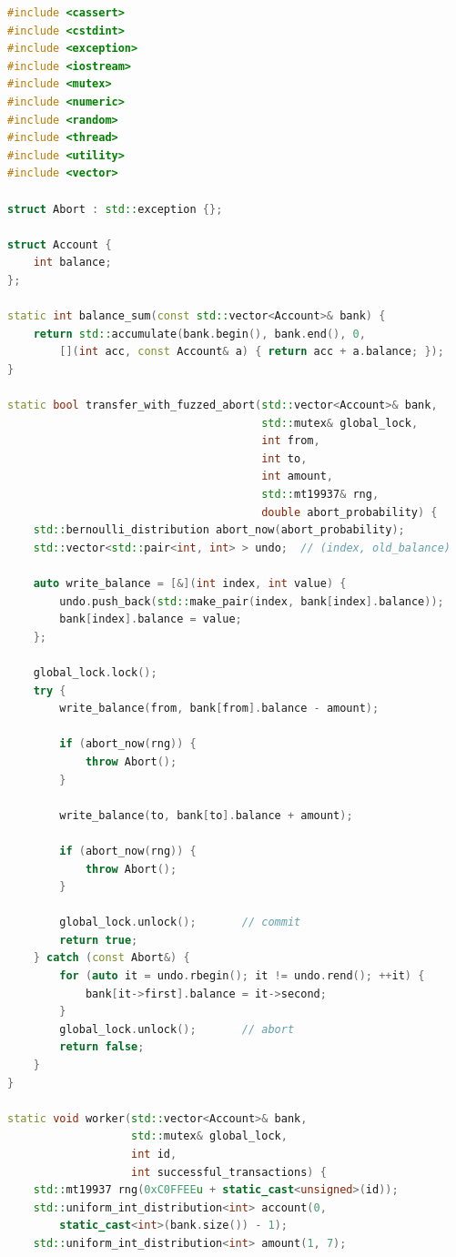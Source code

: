 \begin{lstlisting}[language=C++, caption={A compilable abort-fuzzing harness for the bank benchmark.}, label={lst:abort-fuzz}]
#include <cassert>
#include <cstdint>
#include <exception>
#include <iostream>
#include <mutex>
#include <numeric>
#include <random>
#include <thread>
#include <utility>
#include <vector>

struct Abort : std::exception {};

struct Account {
    int balance;
};

static int balance_sum(const std::vector<Account>& bank) {
    return std::accumulate(bank.begin(), bank.end(), 0,
        [](int acc, const Account& a) { return acc + a.balance; });
}

static bool transfer_with_fuzzed_abort(std::vector<Account>& bank,
                                       std::mutex& global_lock,
                                       int from,
                                       int to,
                                       int amount,
                                       std::mt19937& rng,
                                       double abort_probability) {
    std::bernoulli_distribution abort_now(abort_probability);
    std::vector<std::pair<int, int> > undo;  // (index, old_balance)

    auto write_balance = [&](int index, int value) {
        undo.push_back(std::make_pair(index, bank[index].balance));
        bank[index].balance = value;
    };

    global_lock.lock();
    try {
        write_balance(from, bank[from].balance - amount);

        if (abort_now(rng)) {
            throw Abort();
        }

        write_balance(to, bank[to].balance + amount);

        if (abort_now(rng)) {
            throw Abort();
        }

        global_lock.unlock();       // commit
        return true;
    } catch (const Abort&) {
        for (auto it = undo.rbegin(); it != undo.rend(); ++it) {
            bank[it->first].balance = it->second;
        }
        global_lock.unlock();       // abort
        return false;
    }
}

static void worker(std::vector<Account>& bank,
                   std::mutex& global_lock,
                   int id,
                   int successful_transactions) {
    std::mt19937 rng(0xC0FFEEu + static_cast<unsigned>(id));
    std::uniform_int_distribution<int> account(0,
        static_cast<int>(bank.size()) - 1);
    std::uniform_int_distribution<int> amount(1, 7);


\end{lstlisting}
